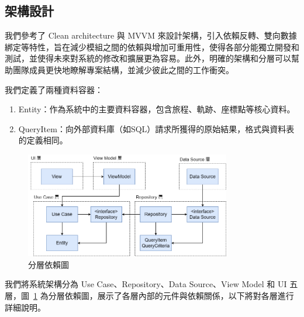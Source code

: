 \subsection{架構設計}

我們參考了 Clean architecture 與 MVVM 來設計架構，引入依賴反轉、雙向數據綁定等特性，旨在減少模組之間的依賴與增加可重用性，使得各部分能獨立開發和測試，並使得未來對系統的修改和擴展更為容易。此外，明確的架構和分層可以幫助團隊成員更快地瞭解專案結構，並減少彼此之間的工作衝突。

我們定義了兩種資料容器：

\begin{enumerate}
    \item Entity：作為系統中的主要資料容器，包含旅程、軌跡、座標點等核心資料。
    \item QueryItem：向外部資料庫（如SQL）請求所獲得的原始結果，格式與資料表的定義相同。
\end{enumerate}

\begin{figure}[H]
    \centering
    \includegraphics[width=0.8\textwidth]{assets/TT分層依賴圖.png}
    \caption{分層依賴圖}
    \label{分層依賴圖}
\end{figure}

我們將系統架構分為 Use Case、Repository、Data Source、View Model 和 UI 五層，圖~\ref{分層依賴圖} 為分層依賴圖，展示了各層內部的元件與依賴關係，以下將對各層進行詳細說明。

